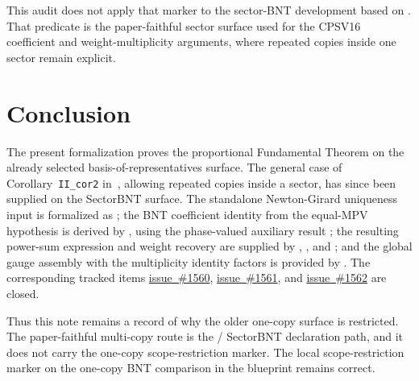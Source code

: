 \documentclass{article}
\begin{document}
This audit does not apply that marker to the sector-BNT development based on
. That predicate is the paper-faithful sector
surface used for the CPSV16 coefficient and weight-multiplicity arguments,
where repeated copies inside one sector remain explicit.

\section{Conclusion}

The present formalization proves the proportional Fundamental Theorem on the
already selected basis-of-representatives surface. The general case of
Corollary~\texttt{II\_cor2} in~\cite{Cirac2016MPDO_arXiv}, allowing repeated
copies inside a sector, has since been supplied on the SectorBNT surface.  The
standalone Newton-Girard uniqueness input is formalized as
; the
BNT coefficient identity from the equal-MPV hypothesis is derived by
, using the phase-valued
auxiliary result
; the resulting
power-sum expression and weight recovery are supplied by
,
, and
; and the global gauge assembly
with the multiplicity identity factors is provided by
.  The
corresponding tracked items
\href{https://github.com/LionSR/TNLean/issues/1560}{issue~\#1560},
\href{https://github.com/LionSR/TNLean/issues/1561}{issue~\#1561}, and
\href{https://github.com/LionSR/TNLean/issues/1562}{issue~\#1562} are closed.

Thus this note remains a record of why the older one-copy surface is restricted.
The paper-faithful multi-copy route is the
 / SectorBNT declaration path, and it does
not carry the one-copy scope-restriction marker.  The local scope-restriction
marker on the one-copy BNT comparison in the blueprint remains correct.



\end{document}
